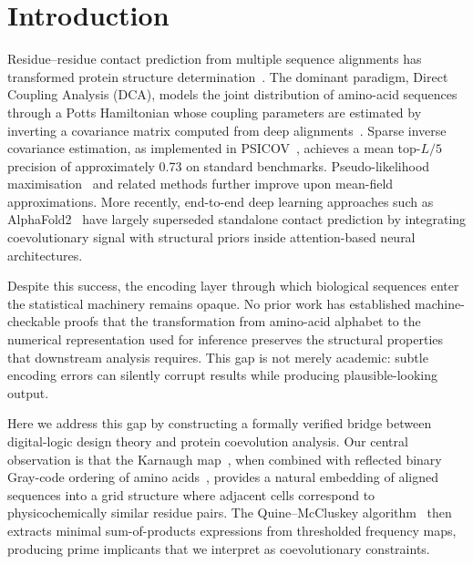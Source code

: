 \section{Introduction}
\label{sec:intro}

Residue--residue contact prediction from multiple sequence alignments has
transformed protein structure determination~\cite{weigt2009,morcos2011,
	jones2012,kamisetty2013}.  The dominant paradigm, Direct Coupling Analysis
(DCA), models the joint distribution of amino-acid sequences through a Potts
Hamiltonian whose coupling parameters are estimated by inverting a covariance
matrix computed from deep alignments~\cite{morcos2011}.  Sparse inverse
covariance estimation, as implemented in PSICOV~\cite{jones2012}, achieves a
mean top-$L/5$ precision of approximately 0.73 on standard benchmarks.
Pseudo-likelihood maximisation~\cite{ekeberg2013} and related methods further
improve upon mean-field approximations.  More recently, end-to-end deep
learning approaches such as AlphaFold2~\cite{jumper2021} have largely
superseded standalone contact prediction by integrating coevolutionary signal
with structural priors inside attention-based neural architectures.

Despite this success, the encoding layer through which biological sequences
enter the statistical machinery remains opaque.  No prior work has
established machine-checkable proofs that the transformation from amino-acid
alphabet to the numerical representation used for inference preserves the
structural properties that downstream analysis requires.  This gap is not
merely academic: subtle encoding errors can silently corrupt results while
producing plausible-looking output.

Here we address this gap by constructing a formally verified bridge between
digital-logic design theory and protein coevolution analysis.  Our central
observation is that the Karnaugh map~\cite{karnaugh1953}, when combined with
reflected binary Gray-code ordering of amino acids~\cite{gray1953}, provides
a natural embedding of aligned sequences into a grid structure where adjacent
cells correspond to physicochemically similar residue pairs.  The
Quine--McCluskey algorithm~\cite{quine1952,mccluskey1956} then extracts
minimal sum-of-products expressions from thresholded frequency maps,
producing prime implicants that we interpret as coevolutionary constraints.


